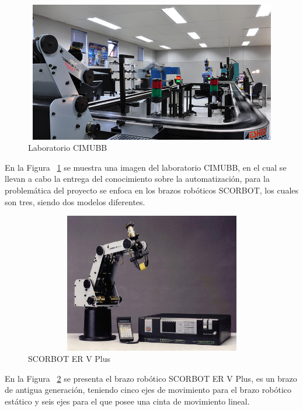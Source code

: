 \begin{figure}[h]
\centering
\includegraphics[width=13cm, height=6.1cm]{figures/cimubb.jpg}
\caption{Laboratorio CIMUBB}
\label{fig:cimubb}
\end{figure}

En la Figura ~\ref{fig:cimubb} se muestra una imagen del laboratorio CIMUBB, en el cual se llevan a cabo la entrega del conocimiento sobre la automatización, para la problemática del proyecto se enfoca en los brazos robóticos SCORBOT, los cuales son tres, siendo dos modelos diferentes.

\begin{figure}[h]
\centering
\includegraphics[width=13cm, height=6.1cm]{figures/scor5p.jpg}
\caption{SCORBOT ER V Plus}
\label{fig:scor5p}
\end{figure}

 En la Figura ~\ref{fig:scor5p} se presenta el brazo robótico SCORBOT ER V Plus, es un brazo de antigua generación, teniendo cinco ejes de movimiento para el brazo robótico estático y seis ejes para el que posee una cinta de movimiento lineal.

\clearpage

